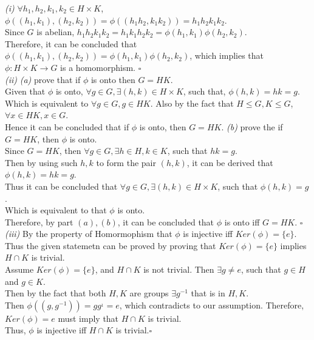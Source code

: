 \documentclass[11pt]{article}
\newenvironment{problem}[2][Problem]{\begin{trivlist}
\item[\hskip \labelsep {\bfseries #1}\hskip \labelsep {\bfseries #2.}]}{\end{trivlist}}
\begin{document}
\begin{problem}{4}
\textit{(i)} $\forall h_1,h_2,k_1,k_2 \in H\times K$, $\phi((h_1,k_1),(h_2, k_2)) = \phi((h_1h_2, k_1 k_2)) = h_1 h_2 k_1 k_2$.\\
Since $G$ is abelian, $h_1 h_2 k_1 k_2 = h_1 k_1 h_2 k_2 = \phi(h_1,k_1) \phi(h_2, k_2)$.\\
Therefore, it can be concluded that $\phi((h_1,k_1),(h_2, k_2)) = \phi(h_1,k_1) \phi(h_2, k_2)$, which implies that $\phi: H \times K \rightarrow G$ is a homomorphism. $\square$\\
\textit{(ii)} \textit{(a)} prove that if $\phi$ is onto then $G = HK$.\\
Given that $\phi$ is onto, $\forall g \in G, \exists (h,k) \in H\times K$, such that, $\phi(h,k) = hk = g$.\\
Which is equivalent to $\forall g \in G, g \in HK$. Also by the fact that $H\leq G, K\leq G$, $\forall x \in HK, x \in G$.\\
Hence it can be concluded that if $\phi$ is onto, then $G = HK$.
\textit{(b)} prove the if $G = HK$, then $\phi$ is onto.\\
Since $G = HK$, then $\forall g\in G, \exists h\in H, k\in K$, such that $hk = g$.\\
Then by using such $h,k$ to form the pair $(h,k)$, it can be derived that $\phi(h,k) = hk = g$. \\
Thus it can be concluded that $\forall g\in G, \exists (h,k) \in H \times K$, such that $\phi(h,k) = g$.\\
Which is equivalent to that $\phi$ is onto.\\
Therefore, by part $(a),(b)$, it can be concluded that $\phi$ is onto iff $G = HK$. $\square$\\
\textit{(iii)} By the property of Homormophism that $\phi$ is injective iff $Ker(\phi) = \{ e \}$.\\
Thus the given statemetn can be proved by proving that $Ker(\phi) = \{e \}$ implies $H \cap K$ is trivial.\\
Assume $Ker(\phi) = \{e \}$, and $H\cap K$ is not trivial. Then $\exists g\neq e$, such  that $g \in H$ and $g\in K$.\\
Then by the fact that both $H,K$ are groups $\exists g^{-1}$ that is in $H,K$.\\
Then $\phi((g,g^{-1})) = gg^{_1} =e$, which contradicts to our assumption. Therefore, $Ker(\phi) = {e}$ must imply that $H \cap K$ is trivial.\\
Thus, $\phi$ is injective iff $H\cap K$ is trivial.$\square$\\
\end{problem}
\end{document}
